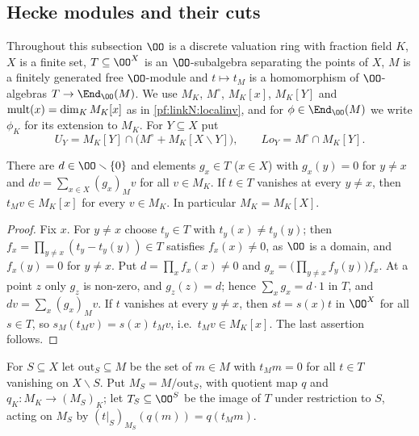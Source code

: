\subsection{Hecke modules and their cuts}\label{sec:pf:linkN:lattice}

Throughout this subsection $\OO$ is a discrete valuation ring with fraction field $K$, $X$ is a finite set,
$T\subseteq\OO^X$ is an $\OO$-subalgebra separating the points of $X$, $M$ is a finitely generated free $\OO$-module and
$t\mapsto t_M$ is a homomorphism of $\OO$-algebras $T\to\End_\OO(M)$. We use $M_K$, $M^\circ$, $M_K[x]$, $M_K[Y]$ and
$\mathrm{mult}(x)=\dim_KM_K[x]$ as in \cref{pf:linkN:localinv}, and for $\phi\in\End_\OO(M)$ we write $\phi_K$ for its
extension to $M_K$. For $Y\subseteq X$ put
\[
U_Y=M_K[Y]\cap\bigl(M^\circ+M_K[X\smallsetminus Y]\bigr),\qquad \mathit{Lo}_Y=M^\circ\cap M_K[Y].
\]

\begin{lemma}\label{pf:linkN:decomp}
There are $d\in\OO\smallsetminus\{0\}$ and elements $g_x\in T$ ($x\in X$) with $g_x(y)=0$ for $y\ne x$ and
$dv=\sum_{x\in X}(g_x)_Mv$ for all $v\in M_K$. If $t\in T$ vanishes at every $y\ne x$, then $t_Mv\in M_K[x]$ for every
$v\in M_K$. In particular $M_K=M_K[X]$.
\end{lemma}

\begin{proof}
Fix $x$. For $y\ne x$ choose $t_y\in T$ with $t_y(x)\ne t_y(y)$; then $f_x=\prod_{y\ne x}(t_y-t_y(y))\in T$ satisfies
$f_x(x)\ne0$, as $\OO$ is a domain, and $f_x(y)=0$ for $y\ne x$. Put $d=\prod_xf_x(x)\ne0$ and
$g_x=\bigl(\prod_{y\ne x}f_y(y)\bigr)f_x$. At a point $z$ only $g_z$ is non-zero, and $g_z(z)=d$; hence $\sum_xg_x=d\cdot1$
in $T$, and $dv=\sum_x(g_x)_Mv$. If $t$ vanishes at every $y\ne x$, then $st=s(x)t$ in $\OO^X$ for all $s\in T$, so
$s_M(t_Mv)=s(x)\,t_Mv$, i.e.\ $t_Mv\in M_K[x]$. The last assertion follows.
\end{proof}

\begin{definition}\label{pf:linkN:cutmodule}
For $S\subseteq X$ let $\mathrm{out}_S\subseteq M$ be the set of $m\in M$ with $t_Mm=0$ for all $t\in T$ vanishing on
$X\smallsetminus S$. Put $M_S=M/\mathrm{out}_S$, with quotient map $q$ and $q_K:M_K\to(M_S)_K$; let $T_S\subseteq\OO^S$ be the
image of $T$ under restriction to $S$, acting on $M_S$ by $(t|_S)_{M_S}(q(m))=q(t_Mm)$.
\end{definition}

